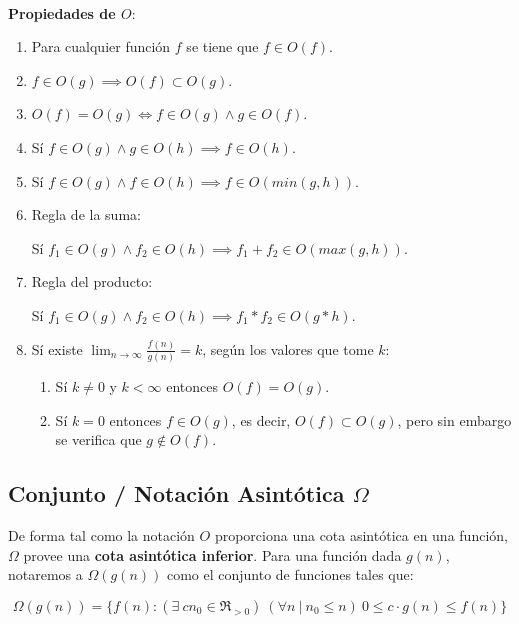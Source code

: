 ~

\textbf{Propiedades de $O$}:
\begin{enumerate}
 \item Para cualquier funci\'on $f$ se tiene que $f \in O(f)$.
 \item $f \in O(g) \implies O(f) \subset O(g)$.
 \item $O(f) = O(g) \iff f \in O(g) \land g \in O(f)$.
 \item S\'i $f \in O(g) \land g \in O(h) \implies f \in O(h)$.
 \item S\'i $f \in O(g) \land f \in O(h) \implies f \in O(min(g,h))$.
 \item Regla de la suma:

	S\'i $f_1 \in O(g) \land f_2 \in O(h) \implies f_1 + f_2 \in O(max(g,h))$.
 \item Regla del producto:

	S\'i $f_1 \in O(g) \land f_2 \in O(h) \implies f_1 * f_2 \in O(g*h)$.
 \item S\'i existe $\lim_{n \to \infty} \frac{f(n)}{g(n)} = k$, seg\'un los valores que tome $k$:
	\begin{enumerate}
	  \item S\'i $k \neq 0$ y $k < \infty$ entonces $O(f) = O(g)$.
	  \item S\'i $k = 0$ entonces $f \in O(g)$, es decir, $O(f) \subset O(g)$, pero sin embargo se verifica que $g \notin O(f)$.
	\end{enumerate}
\end{enumerate}

\subsection{Conjunto / Notaci\'on Asint\'otica $\Omega$}

De forma tal como la notaci\'on $O$ proporciona una cota asint\'otica en una funci\'on, $\Omega$ provee una \textbf{cota asint\'otica inferior}. Para una funci\'on dada $g(n)$, notaremos a $\Omega(g(n))$ como el conjunto de funciones tales que:

\begin{equation*}
 \Omega(g(n)) = \{ f(n) : (\exists\ c n_0 \in \Re_{>0}) \ (\forall n\ |\ n_0 \leq n)\ 0 \leq c \cdot g(n) \leq f(n) \}
\end{equation*}

~

